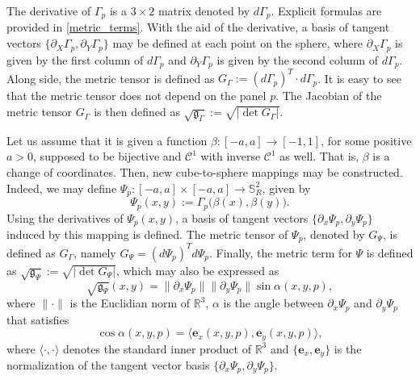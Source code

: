 \documentclass[preprint,12pt]{elsarticle}
\begin{document}
\begin{linenumbers}
The derivative of ${\Gamma}_p$ is a $3\times2$ matrix denoted by $d{\Gamma}_p$. Explicit formulas are provided in  \ref{metric_terms}.
With the aid of the derivative,  a basis of tangent vectors $\{{\partial_X {\Gamma}_p, \partial_Y {\Gamma}_p}\}$ may be defined
at each point on the sphere, where $\partial_X {\Gamma}_p$ is given by the first column of $d{\Gamma}_p$ 
and $\partial_Y {\Gamma}_p$ is given by the second column of $d{\Gamma}_p$.
Along side, the metric tensor is defined as
$G_{{\Gamma}} := (d\Gamma_p)^T \cdot d\Gamma_p$.
It is easy to see that the metric tensor does not depend on the panel $p$.
The Jacobian of the metric tensor $G_{{\Gamma}}$ is then defined as $\sqrt{\mathfrak{g}_{{\Gamma}}} :=
\sqrt{|\det{G_{{\Gamma}}}|}.$

Let us assume that it is given a function $\beta:[-a,a] \to [-1,1]$, for some positive $a>0$,
supposed to be bijective and $\mathcal{C}^1$ with inverse $\mathcal{C}^1$ as well.
That is, $\beta$ is a change of coordinates.
Then, new cube-to-sphere mappings may be constructed.
Indeed, we may define $ {\Psi}_p: [-a,a]\times [-a,a] \to \mathbb{S}^2_R$,
given by 
\begin{equation}
	\label{psi-def}
	{\Psi}_p(x,y) := {\Gamma}_p\big(\beta(x),\beta(y)\big).
\end{equation}
Using the derivatives of ${\Psi}_p(x,y)$, a basis of tangent vectors $\{{\partial_x {\Psi}_p}, {\partial_y {\Psi}_p}\}$ induced by this mapping is defined.
The metric tensor of ${\Psi}_p$, denoted by $G_{\Psi}$, is defined as $G_{\Gamma}$, namely $G_{\Psi} = (d\Psi_p)^T d\Psi_p$.
Finally, the metric term for $\Psi$ is defined as $\sqrt{\mathfrak{g}_{\Psi}}:= \sqrt{|\det{G_{\Psi}}|}$,
which may also be expressed as
\begin{equation}
	\label{mt-sina}
	\sqrt{\mathfrak{g}_{\Psi}}(x,y) =	
	\|\partial_x  {\Psi}_p \| \|\partial_y  {\Psi}_p \| \sin \alpha(x,y,p),
\end{equation}
where $\|\cdot\|$ is the Euclidian norm of $\mathbb{R}^3$, $\alpha$ is the angle between $\partial_x {\Psi}_p$ and $\partial_y {\Psi}_p$ that
satisfies
\begin{equation}
	\label{mt-cosa}
	\cos{\alpha(x,y,p)} = {\langle
		\boldsymbol{e}_x(x,y,p),
		\boldsymbol{e}_y(x,y,p) \rangle },
\end{equation}
where $\langle \cdot, \cdot \rangle$ denotes 
the standard inner product of $\mathbb{R}^3$ and 
$\{\boldsymbol{e}_x, \boldsymbol{e}_y\}$ is the normalization of the tangent vector basis
$\{{\partial_x {\Psi}_p}, {\partial_y {\Psi}_p}\}$.


\end{linenumbers}
\end{document}
